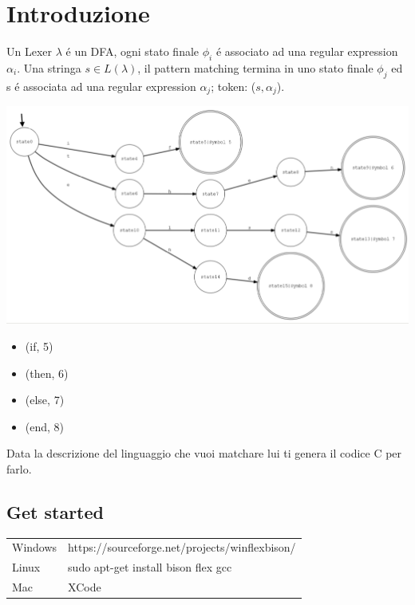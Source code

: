 \chapter{Introduzione}

Un Lexer $\lambda $ \'e un DFA, ogni stato finale $\phi _i$ \'e associato ad una regular expression $\alpha _i$.
Una stringa $s \in L(\lambda )$, il pattern matching termina in uno stato finale $\phi _j$ ed s \'e associata ad una regular expression 
$\alpha _j$; token: ($s, \alpha _j$).

\begin{center}
	\includegraphics[scale=0.35]{Chapters/Img/c01_01.png}\\
\end{center}
	

\begin{itemize}
	\item (if, 5) \\
	\item (then, 6)\\
	\item (else, 7)\\
	\item (end, 8)\\
\end{itemize}

Data la descrizione del linguaggio che vuoi matchare lui ti genera il codice C per farlo. 

\section{Get started}
\begin{tabular}{ll}
	Windows & https://sourceforge.net/projects/winflexbison/ \\
	Linux & sudo apt-get install bison flex gcc\\
	Mac & XCode
\end{tabular}

